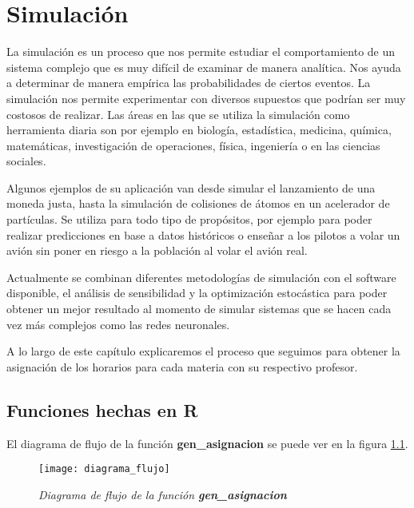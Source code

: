 \chapter{Simulación}

La simulación es un proceso que nos permite estudiar el comportamiento de un sistema complejo que es muy difícil de examinar de manera analítica. Nos ayuda a determinar de manera empírica las probabilidades de ciertos eventos. La simulación nos permite experimentar con diversos supuestos que podrían ser muy costosos de realizar. Las áreas en las que se utiliza la simulación como herramienta diaria son por ejemplo en biología, estadística, medicina, química, matemáticas, investigación de operaciones, física, ingeniería o en las ciencias sociales.

Algunos ejemplos de su aplicación van desde simular el lanzamiento de una moneda justa, hasta la simulación de colisiones de átomos en un acelerador de partículas. Se utiliza para todo tipo de propósitos, por ejemplo para poder realizar predicciones en base a datos históricos o enseñar a los pilotos a volar un avión sin poner en riesgo a la población al volar el avión real.

Actualmente se combinan diferentes metodologías de simulación con el software disponible, el análisis de sensibilidad y la optimización estocástica para poder obtener un mejor resultado al momento de simular sistemas que se hacen cada vez más complejos como las redes neuronales.

A lo largo de este capítulo explicaremos el proceso que seguimos para obtener la asignación de los horarios para cada materia con su respectivo profesor.

\section{Funciones hechas en R}

El diagrama de flujo de la función \textbf{gen\_asignacion} se puede ver en la figura \ref{DF_genAsig}.

\begin{figure}[H]
\centering
\texttt{[image: diagrama\_flujo]} %
\caption{\textit{Diagrama de flujo de la función \textbf{gen\_asignacion}}}\label{DF_genAsig}
\end{figure}


